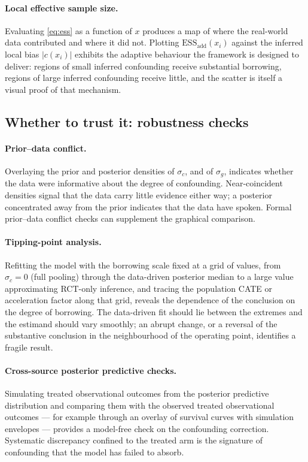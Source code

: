 \paragraph{Local effective sample size.}
Evaluating \eqref{eq:ess} as a function of $x$ produces a map of where the
real-world data contributed and where it did not. Plotting
$\mathrm{ESS}_{\text{add}}(x_i)$ against the inferred local bias $|c(x_i)|$
exhibits the adaptive behaviour the framework is designed to deliver: regions of
small inferred confounding receive substantial borrowing, regions of large
inferred confounding receive little, and the scatter is itself a visual proof of
that mechanism.

\subsection{Whether to trust it: robustness checks}

\paragraph{Prior--data conflict.}
Overlaying the prior and posterior densities of $\sigma_c$, and of $\sigma_g$,
indicates whether the data were informative about the degree of confounding.
Near-coincident densities signal that the data carry little evidence either way;
a posterior concentrated away from the prior indicates that the data have
spoken. Formal prior--data conflict checks \citep{evans2006} can supplement the
graphical comparison.

\paragraph{Tipping-point analysis.}
Refitting the model with the borrowing scale fixed at a grid of values, from
$\sigma_c = 0$ (full pooling) through the data-driven posterior median to a large
value approximating RCT-only inference, and tracing the population CATE or
acceleration factor along that grid, reveals the dependence of the conclusion on
the degree of borrowing. The data-driven fit should lie between the extremes and
the estimand should vary smoothly; an abrupt change, or a reversal of the
substantive conclusion in the neighbourhood of the operating point, identifies a
fragile result.

\paragraph{Cross-source posterior predictive checks.}
Simulating treated observational outcomes from the posterior predictive
distribution and comparing them with the observed treated observational
outcomes --- for example through an overlay of survival curves with simulation
envelopes \citep{gelman1996} --- provides a model-free check on the confounding
correction. Systematic discrepancy confined to the treated arm is the signature
of confounding that the model has failed to absorb.

